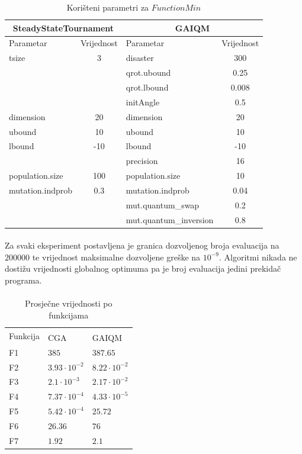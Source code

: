 \documentclass[times, utf8, zavrsni, numeric]{fer}
\begin{document}
\begin{table}[htb]
\caption{Korišteni parametri za $FunctionMin$}
\centering
\begin{tabular}{|l|c||l|c|} \hline
\multicolumn{2}{|c||}{SteadyStateTournament} & \multicolumn{2}{c|}{GAIQM} \\ 
\hline
Parametar & Vrijednost & Parametar & Vrijednost \\ 
\hline
tsize & 3 & disaster & 300 \\
&& qrot.ubound & 0.25 \\
&& qrot.lbound & 0.008 \\
&& initAngle & 0.5 \\
dimension & 20 & dimension & 20 \\
ubound & 10 & ubound & 10 \\
lbound & -10 & lbound & -10 \\
&& precision & 16 \\
population.size & 100 & population.size & 10 \\
mutation.indprob & 0.3 & mutation.indprob & 0.04 \\
&& mut.quantum\_swap & 0.2 \\
&& mut.quantum\_inversion & 0.8 \\
\hline
\end{tabular}
\end{table}

\paragraph{}
Za svaki eksperiment postavljena je granica dozvoljenog broja evaluacija na $200000$ te vrijednost maksimalne dozvoljene greške na $10^{-9}$. Algoritmi nikada ne dostižu vrijednosti globalnog optimuma pa je broj evaluacija jedini prekidač programa.

\clearpage

\paragraph{}
\begin{table}[htb]
\caption{Prosječne vrijednosti po funkcijama}
\centering
\begin{tabular}{|l|>{\centering\arraybackslash}p{2.5cm}|>{\centering\arraybackslash}p{2.5cm}|} \hline
\multirow{2}{*}{Funkcija} & \multicolumn{2}{c|}{Prosječno odstupanje} \\ \cline{2-3}
& CGA & GAIQM \\
\hline
F1 & $385$ & $387.65$ \\
F2 & $3.93\cdot 10^{-2}$ & $8.22\cdot 10^{-2}$ \\
F3 & $2.1\cdot 10^{-3}$ & $2.17\cdot 10^{-2}$ \\
F4 & $7.37\cdot 10^{-4}$ & $4.33\cdot 10^{-5}$ \\
F5 & $5.42\cdot 10^{-4}$ & $25.72$ \\
F6 & $26.36$ & $76$ \\
F7 & $1.92$ & $2.1$ \\
\hline
\end{tabular}
\end{table}
\end{document}
